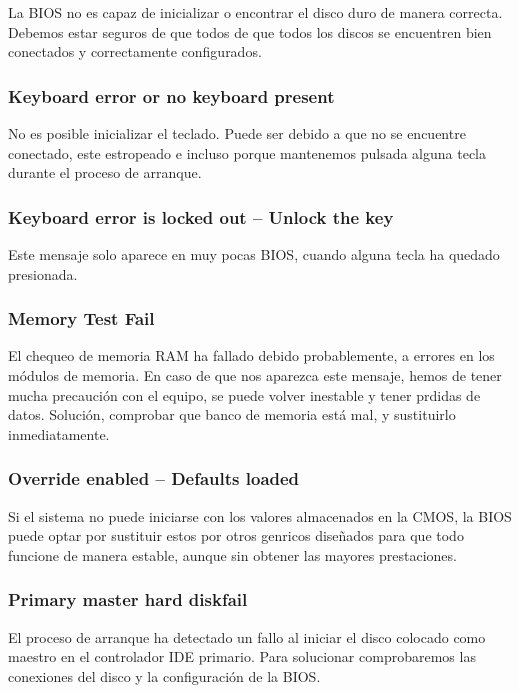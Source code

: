 \documentclass[12pt,oneside,a4paper]{article}
\begin{document}
		La BIOS no es capaz de inicializar o encontrar el disco duro de
		manera correcta. Debemos estar seguros de que todos de que todos
		los discos se encuentren bien conectados y correctamente
		configurados.

		\subsubsection{Keyboard error or no keyboard present}

		No es posible inicializar el teclado. Puede ser debido a que no se
		encuentre conectado, este estropeado e incluso porque mantenemos
		pulsada alguna tecla durante el proceso de arranque.

		\subsubsection{Keyboard error is locked out – Unlock the key}

		Este mensaje solo aparece en muy pocas BIOS, cuando alguna tecla ha
		quedado presionada. 

		\subsubsection{Memory Test Fail}

		El chequeo de memoria RAM ha fallado debido probablemente, a
		errores en los módulos de memoria. En caso de que nos aparezca este
		mensaje, hemos de tener mucha precaución con el equipo, se puede
		volver inestable y tener prdidas de datos. Solución, comprobar que
		banco de memoria está mal, y sustituirlo inmediatamente. 

		\subsubsection{Override enabled – Defaults loaded}

		Si el sistema no puede iniciarse con los valores almacenados en la
		CMOS, la BIOS puede optar por sustituir estos por otros genricos
		diseñados para que todo funcione de manera estable, aunque sin
		obtener las mayores prestaciones. 

		\subsubsection{Primary master hard diskfail}

		El proceso de arranque ha detectado un fallo al iniciar el disco
		colocado como maestro en el controlador IDE primario. Para
		solucionar comprobaremos las conexiones del disco y la
		configuración de la BIOS. 
	
\end{document}
